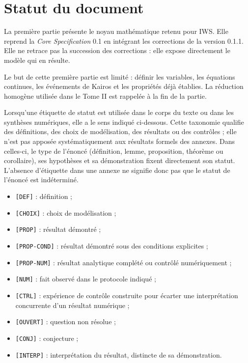 \chapter*{Statut du document}\label{statut-document}

La première partie présente le noyau mathématique retenu pour IWS. Elle reprend la \emph{Core Specification} 0.1 en intégrant les corrections de la version 0.1.1. Elle ne retrace pas la succession des corrections : elle expose directement le modèle qui en résulte.

Le but de cette première partie est limité : définir les variables, les équations continues, les événements de Kairos et les propriétés déjà établies. La réduction homogène utilisée dans le Tome II est rappelée à la fin de la partie.

Lorsqu'une étiquette de statut est utilisée dans le corps du texte ou dans les synthèses numériques, elle a le sens indiqué ci-dessous. Cette taxonomie qualifie des définitions, des choix de modélisation, des résultats ou des contrôles ; elle n'est pas apposée systématiquement aux résultats formels des annexes. Dans celles-ci, le type de l'énoncé (définition, lemme, proposition, théorème ou corollaire), ses hypothèses et sa démonstration fixent directement son statut. L'absence d'étiquette dans une annexe ne signifie donc pas que le statut de l'énoncé est indéterminé.

\begin{itemize}
\tightlist
\item
  \texttt{{[}DEF{]}} : définition ;
\item
  \texttt{{[}CHOIX{]}} : choix de modélisation ;
\item
  \texttt{{[}PROP{]}} : résultat démontré ;
\item
  \texttt{{[}PROP-COND{]}} : résultat démontré sous des conditions
  explicites ;
\item
  \texttt{{[}PROP-NUM{]}} : résultat analytique complété ou contrôlé
  numériquement ;
\item
  \texttt{{[}NUM{]}} : fait observé dans le protocole indiqué ;
\item
  \texttt{{[}CTRL{]}} : expérience de contrôle construite pour écarter une interprétation concurrente d'un résultat numérique ;
\item
  \texttt{{[}OUVERT{]}} : question non résolue ;
\item
  \texttt{{[}CONJ{]}} : conjecture ;
\item
  \texttt{{[}INTERP{]}} : interprétation du résultat, distincte de sa
  démonstration.
\end{itemize}

